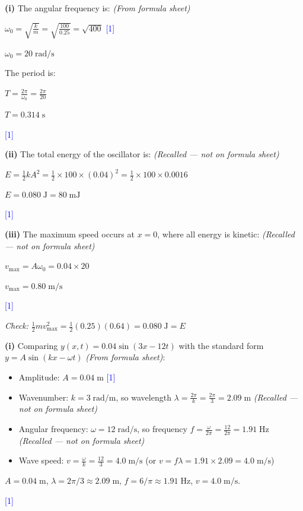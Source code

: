 \documentclass[12pt,a4paper]{article}
\newcommand{\markstep}[1]{\hfill\textcolor{blue}{[#1]}}
\newcommand{\finalanswer}[1]{%
  \begin{tcolorbox}[colback=green!5!white,colframe=green!50!black,boxrule=0.5pt]
  #1
  \end{tcolorbox}
}
\newcommand{\fromsheet}{\textit{(From formula sheet)}}
\newcommand{\recalled}{\textit{(Recalled --- not on formula sheet)}}
\begin{document}
\begin{parts}

\item

\textbf{(i)} The angular frequency is: \fromsheet

$\omega_0 = \sqrt{\frac{k}{m}} = \sqrt{\frac{100}{0.25}} = \sqrt{400}$ \markstep{1}

\finalanswer{$\omega_0 = 20\;\text{rad/s}$}

The period is:

$T = \frac{2\pi}{\omega_0} = \frac{2\pi}{20}$

\finalanswer{$T = 0.314\;\text{s}$} \markstep{1}

\textbf{(ii)} The total energy of the oscillator is: \recalled

$E = \tfrac{1}{2}kA^2 = \tfrac{1}{2}\times 100\times (0.04)^2 = \tfrac{1}{2}\times 100\times 0.0016$

\finalanswer{$E = 0.080\;\text{J} = 80\;\text{mJ}$} \markstep{1}

\textbf{(iii)} The maximum speed occurs at $x = 0$, where all energy is kinetic: \recalled

$v_{\max} = A\omega_0 = 0.04\times 20$

\finalanswer{$v_{\max} = 0.80\;\text{m/s}$} \markstep{1}

\textit{Check:} $\frac{1}{2}mv_{\max}^2 = \frac{1}{2}(0.25)(0.64) = 0.080\;\text{J} = E$ \checkmark

\item

\textbf{(i)} Comparing $y(x,t) = 0.04\sin(3x - 12t)$ with the standard form $y = A\sin(kx - \omega t)$ \fromsheet:

\begin{itemize}
\item Amplitude: $A = 0.04\;\text{m}$ \markstep{1}
\item Wavenumber: $k = 3\;\text{rad/m}$, so wavelength $\lambda = \frac{2\pi}{k} = \frac{2\pi}{3} = 2.09\;\text{m}$ \recalled
\item Angular frequency: $\omega = 12\;\text{rad/s}$, so frequency $f = \frac{\omega}{2\pi} = \frac{12}{2\pi} = 1.91\;\text{Hz}$ \recalled
\item Wave speed: $v = \frac{\omega}{k} = \frac{12}{3} = 4.0\;\text{m/s}$ (or $v = f\lambda = 1.91\times 2.09 = 4.0\;\text{m/s}$)
\end{itemize}

\finalanswer{$A = 0.04\;\text{m}$, $\lambda = 2\pi/3 \approx 2.09\;\text{m}$, $f = 6/\pi \approx 1.91\;\text{Hz}$, $v = 4.0\;\text{m/s}$.} \markstep{1}


\end{parts}
\end{document}
